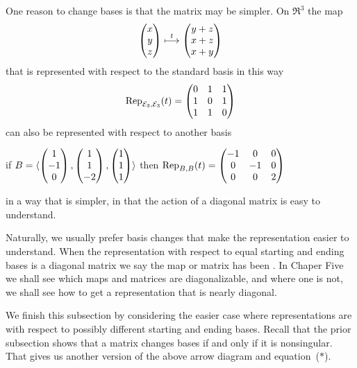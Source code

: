 \begin{example} \label{ex:DiagizedMat}
One reason to change bases is that the matrix may be simpler.
On \( \Re^3 \) the map
\begin{equation*}
  \colvec{x \\ y \\ z}\mapsunder{t}\colvec{y+z \\ x+z \\ x+y}
\end{equation*}
that is represented with respect to the standard basis in this way
\begin{equation*}
  \rep{t}{\stdbasis_3,\stdbasis_3}=
  \begin{pmatrix}
    0  &1  &1  \\
    1  &0  &1  \\
    1  &1  &0
  \end{pmatrix}
\end{equation*}
can also  be represented with respect to another basis
\begin{center}
  if 
  $B=\sequence{\colvec{1 \\ -1 \\ 0},
                             \colvec{1 \\ 1 \\ -2},
                             \colvec{1 \\ 1 \\ 1}}$ 
  \hspace*{1.5em} then 
  $\rep{t}{B,B}=
  \begin{pmatrix}
   -1  &0  &0  \\
    0  &-1 &0  \\
    0  &0  &2
  \end{pmatrix}$
\end{center}
in a way that is simpler, in that the action of a diagonal
matrix is easy to understand.
\end{example}

Naturally, we usually prefer basis changes that make the
representation easier to understand.
When the representation with respect to equal starting
and ending bases is a diagonal matrix we say the map or matrix
has been .
In Chaper Five we shall see which maps and matrices are diagonalizable, 
and where one is not, we shall see how to get a representation that is nearly 
diagonal.

We finish this subsection by considering the easier case 
where representations are with respect to possibly different starting and 
ending bases.
Recall that the prior subsection 
shows that a matrix changes bases if and only if it is nonsingular.
That gives us another version of the above  arrow diagram
and equation~($*$).

